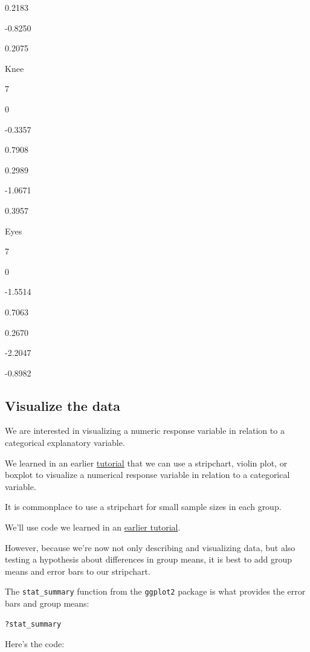 \documentclass[
]{book}
\begin{document}
0.2183

-0.8250

0.2075

Knee

7

0

-0.3357

0.7908

0.2989

-1.0671

0.3957

Eyes

7

0

-1.5514

0.7063

0.2670

-2.2047

-0.8982

\subsection{Visualize the data}\label{anova_graph1}

We are interested in visualizing a numeric response variable in relation to a categorical explanatory variable.

We learned in an earlier \hyperref[numeric_vs_cat]{tutorial} that we can use a stripchart, violin plot, or boxplot to visualize a numerical response variable in relation to a categorical variable.

It is commonplace to use a stripchart for small sample sizes in each group.

We'll use code we learned in an \hyperref[numeric_vs_cat]{earlier tutorial}.

However, because we're now not only describing and visualizing data, but also testing a hypothesis about differences in group means, it is best to add group means and error bars to our stripchart.

The \texttt{stat\_summary} function from the \texttt{ggplot2} package is what provides the error bars and group means:

\begin{verbatim}
?stat_summary
\end{verbatim}

Here's the code:
\end{document}
